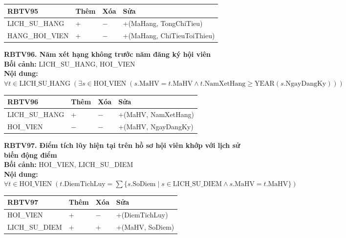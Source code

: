 \documentclass[11pt, a4paper]{article}
\begin{document}
\vspace{0.3em}
\begin{small}
\begin{tabularx}{\textwidth}{| C{4.2cm} | C{2cm} | C{2cm} | Y |}
\hline
\textbf{RBTV95} & \textbf{Thêm} & \textbf{Xóa} & \textbf{Sửa} \\
\hline
LICH\_SU\_HANG & + & $-$ & +(MaHang, TongChiTieu) \\
\hline
HANG\_HOI\_VIEN & + & $-$ & +(MaHang, ChiTieuToiThieu) \\
\hline
\end{tabularx}
\end{small}

\vspace{0.8em}
\textbf{RBTV96. Năm xét hạng không trước năm đăng ký hội viên} \\
\textbf{Bối cảnh:} LICH\_SU\_HANG, HOI\_VIEN \\
\textbf{Nội dung:} $\forall t \in \text{LICH\_SU\_HANG} \; (\exists s \in \text{HOI\_VIEN} \; (s.\text{MaHV} = t.\text{MaHV} \land t.\text{NamXetHang} \ge \text{YEAR}(s.\text{NgayDangKy})))$

\vspace{0.3em}
\begin{small}
\begin{tabularx}{\textwidth}{| C{4.2cm} | C{2cm} | C{2cm} | Y |}
\hline
\textbf{RBTV96} & \textbf{Thêm} & \textbf{Xóa} & \textbf{Sửa} \\
\hline
LICH\_SU\_HANG & + & $-$ & +(MaHV, NamXetHang) \\
\hline
HOI\_VIEN & $-$ & $-$ & +(MaHV, NgayDangKy) \\
\hline
\end{tabularx}
\end{small}

\vspace{0.8em}
\textbf{RBTV97. Điểm tích lũy hiện tại trên hồ sơ hội viên khớp với lịch sử biến động điểm} \\
\textbf{Bối cảnh:} HOI\_VIEN, LICH\_SU\_DIEM \\
\textbf{Nội dung:} $\forall t \in \text{HOI\_VIEN} \; (t.\text{DiemTichLuy} = \sum \{s.\text{SoDiem} \mid s \in \text{LICH\_SU\_DIEM} \land s.\text{MaHV} = t.\text{MaHV}\})$

\vspace{0.3em}
\begin{small}
\begin{tabularx}{\textwidth}{| C{4.2cm} | C{2cm} | C{2cm} | Y |}
\hline
\textbf{RBTV97} & \textbf{Thêm} & \textbf{Xóa} & \textbf{Sửa} \\
\hline
HOI\_VIEN & + & $-$ & +(DiemTichLuy) \\
\hline
LICH\_SU\_DIEM & + & + & +(MaHV, SoDiem) \\
\hline
\end{tabularx}
\end{small}
\end{document}
